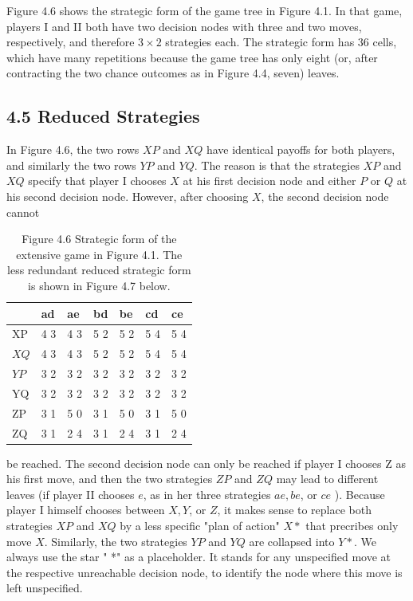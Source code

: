 \documentclass[12pt]{article}
\begin{document}
Figure 4.6 shows the strategic form of the game tree in Figure 4.1. In that game, players I and II both have two decision nodes with three and two moves, respectively, and therefore $3 \times 2$ strategies each. The strategic form has 36 cells, which have many repetitions because the game tree has only eight (or, after contracting the two chance outcomes as in Figure 4.4, seven) leaves.

\subsection*{4.5 Reduced Strategies}
In Figure 4.6, the two rows $X P$ and $X Q$ have identical payoffs for both players, and similarly the two rows $Y P$ and $Y Q$. The reason is that the strategies $X P$ and $X Q$ specify that player I chooses $X$ at his first decision node and either $P$ or $Q$ at his second decision node. However, after choosing $X$, the second decision node cannot

\begin{table}[h]
\begin{center}
\begin{tabular}{|l|l|l|l|l|l|l|}
\hline
 & ad & ae & bd & be & cd & ce \\
\hline
XP & 4 3 & 4 3 & 5 2 & 5 2 & 5 4 & 5 4 \\
\hline
$X Q$ & 4 3 & 4 3 & 5 2 & 5 2 & 5 4 & 5 4 \\
\hline
$Y P$ & 3 2 & 3 2 & 3 2 & 3 2 & 3 2 & 3 2 \\
\hline
YQ & 3 2 & 3 2 & 3 2 & 3 2 & 3 2 & 3 2 \\
\hline
ZP & 3 1 & 5 0 & 3 1 & 5 0 & 3 1 & 5 0 \\
\hline
ZQ & 3 1 & 2 4 & 3 1 & 2 4 & 3 1 & 2 4 \\
\hline
\end{tabular}
\captionsetup{labelformat=empty}
\caption{Figure 4.6 Strategic form of the extensive game in Figure 4.1. The less redundant reduced strategic form is shown in Figure 4.7 below.}
\end{center}
\end{table}

be reached. The second decision node can only be reached if player I chooses Z as his first move, and then the two strategies $Z P$ and $Z Q$ may lead to different leaves (if player II chooses $e$, as in her three strategies $a e, b e$, or $c e$ ). Because player I himself chooses between $X, Y$, or $Z$, it makes sense to replace both strategies $X P$ and $X Q$ by a less specific "plan of action" $X *$ that precribes only move $X$. Similarly, the two strategies $Y P$ and $Y Q$ are collapsed into $Y *$. We always use the star " *" as a placeholder. It stands for any unspecified move at the respective unreachable decision node, to identify the node where this move is left unspecified.
\end{document}
